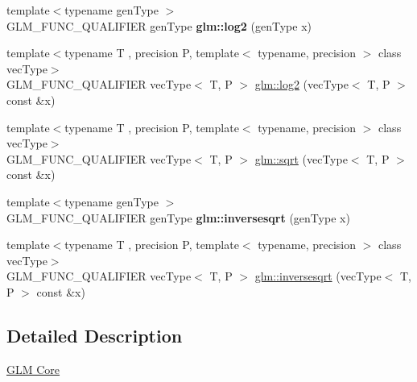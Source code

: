 \begin{DoxyCompactItemize}
\item 
\mbox{\label{func__exponential_8inl_ab47f0f29ead9cefd62d62ba5f83fe81b}} 
{\footnotesize template$<$typename gen\+Type $>$ }\\G\+L\+M\+\_\+\+F\+U\+N\+C\+\_\+\+Q\+U\+A\+L\+I\+F\+I\+ER gen\+Type {\bfseries glm\+::log2} (gen\+Type x)
\item 
{\footnotesize template$<$typename T , precision P, template$<$ typename, precision $>$ class vec\+Type$>$ }\\G\+L\+M\+\_\+\+F\+U\+N\+C\+\_\+\+Q\+U\+A\+L\+I\+F\+I\+ER vec\+Type$<$ T, P $>$ \hyperlink{group__core__func__exponential_gabae30945338a555a03733f00dad95d0d}{glm\+::log2} (vec\+Type$<$ T, P $>$ const \&x)
\item 
{\footnotesize template$<$typename T , precision P, template$<$ typename, precision $>$ class vec\+Type$>$ }\\G\+L\+M\+\_\+\+F\+U\+N\+C\+\_\+\+Q\+U\+A\+L\+I\+F\+I\+ER vec\+Type$<$ T, P $>$ \hyperlink{group__core__func__exponential_gae7ac2e44c14d4e8004098d0bfba6e2b8}{glm\+::sqrt} (vec\+Type$<$ T, P $>$ const \&x)
\item 
\mbox{\label{func__exponential_8inl_a5e3dd2bba414db15477d43ca9d71acf5}} 
{\footnotesize template$<$typename gen\+Type $>$ }\\G\+L\+M\+\_\+\+F\+U\+N\+C\+\_\+\+Q\+U\+A\+L\+I\+F\+I\+ER gen\+Type {\bfseries glm\+::inversesqrt} (gen\+Type x)
\item 
{\footnotesize template$<$typename T , precision P, template$<$ typename, precision $>$ class vec\+Type$>$ }\\G\+L\+M\+\_\+\+F\+U\+N\+C\+\_\+\+Q\+U\+A\+L\+I\+F\+I\+ER vec\+Type$<$ T, P $>$ \hyperlink{group__core__func__exponential_ga599103d4fe4ef2234761ba8da7268627}{glm\+::inversesqrt} (vec\+Type$<$ T, P $>$ const \&x)
\end{DoxyCompactItemize}


\subsection{Detailed Description}
\hyperlink{group__core}{G\+LM Core} 